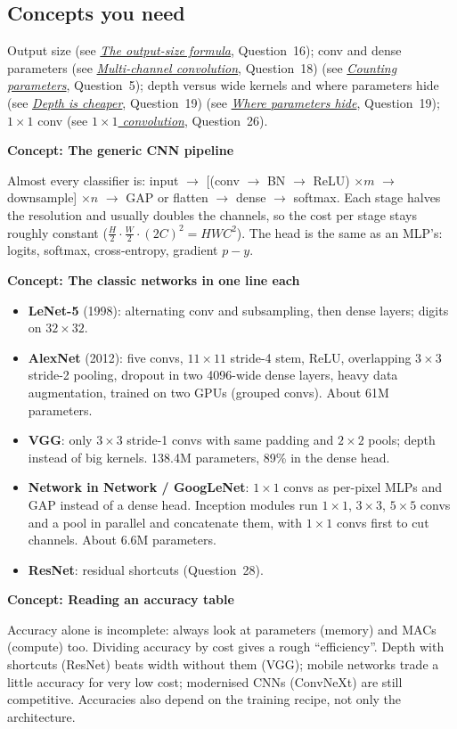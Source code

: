\documentclass[12pt,a4paper]{article}
\newcommand{\concept}[2]{\par\medskip\phantomsection\label{#1}{\large\bfseries\color{blue!50!black} Concept: #2}\par}
\newcommand{\seeconcept}[3]{(see \hyperref[#1]{\textit{#2}}, Question~#3)}
\begin{document}
\subsection*{Concepts you need}
Output size \seeconcept{c:outsize}{The output-size formula}{16}; conv and dense parameters \seeconcept{c:multichannel}{Multi-channel convolution}{18} \seeconcept{c:paramcount}{Counting parameters}{5}; depth versus wide kernels and where parameters hide \seeconcept{c:depth}{Depth is cheaper}{19} \seeconcept{c:gap}{Where parameters hide}{19}; $1\times1$ conv \seeconcept{c:pointwise}{$1\times1$ convolution}{26}.

\concept{c:pipeline}{The generic CNN pipeline}
Almost every classifier is: input $\to$ [(conv $\to$ BN $\to$ ReLU) $\times m$ $\to$ downsample] $\times n$ $\to$ GAP or flatten $\to$ dense $\to$ softmax. Each stage halves the resolution and usually doubles the channels, so the cost per stage stays roughly constant ($\tfrac H2\cdot\tfrac W2\cdot(2C)^2=HWC^2$). The head is the same as an MLP's: logits, softmax, cross-entropy, gradient $p-y$.

\concept{c:history}{The classic networks in one line each}
\begin{itemize}[nosep]
\item \textbf{LeNet-5} (1998): alternating conv and subsampling, then dense layers; digits on $32\times32$.
\item \textbf{AlexNet} (2012): five convs, $11\times11$ stride-4 stem, ReLU, overlapping $3\times3$ stride-2 pooling, dropout in two 4096-wide dense layers, heavy data augmentation, trained on two GPUs (grouped convs). About 61M parameters.
\item \textbf{VGG}: only $3\times3$ stride-1 convs with same padding and $2\times2$ pools; depth instead of big kernels. 138.4M parameters, 89\% in the dense head.
\item \textbf{Network in Network / GoogLeNet}: $1\times1$ convs as per-pixel MLPs and GAP instead of a dense head. Inception modules run $1\times1$, $3\times3$, $5\times5$ convs and a pool in parallel and concatenate them, with $1\times1$ convs first to cut channels. About 6.6M parameters.
\item \textbf{ResNet}: residual shortcuts (Question~28).
\end{itemize}

\concept{c:readtable}{Reading an accuracy table}
Accuracy alone is incomplete: always look at parameters (memory) and MACs (compute) too. Dividing accuracy by cost gives a rough ``efficiency''. Depth with shortcuts (ResNet) beats width without them (VGG); mobile networks trade a little accuracy for very low cost; modernised CNNs (ConvNeXt) are still competitive. Accuracies also depend on the training recipe, not only the architecture.
\end{document}

